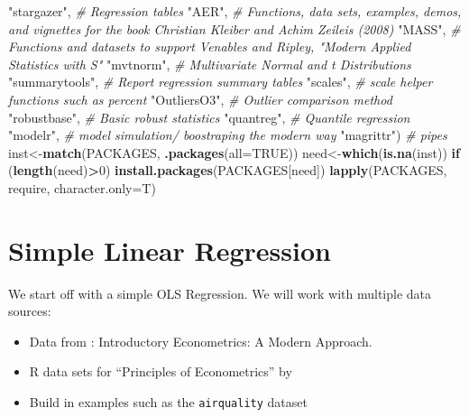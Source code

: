 \documentclass[]{book}
\newenvironment{Shaded}{\begin{snugshade}}{\end{snugshade}}
\newcommand{\CommentTok}[1]{\textcolor[rgb]{0.56,0.35,0.01}{\textit{#1}}}
\newcommand{\ControlFlowTok}[1]{\textcolor[rgb]{0.13,0.29,0.53}{\textbf{#1}}}
\newcommand{\DataTypeTok}[1]{\textcolor[rgb]{0.13,0.29,0.53}{#1}}
\newcommand{\DecValTok}[1]{\textcolor[rgb]{0.00,0.00,0.81}{#1}}
\newcommand{\KeywordTok}[1]{\textcolor[rgb]{0.13,0.29,0.53}{\textbf{#1}}}
\newcommand{\NormalTok}[1]{#1}
\newcommand{\OperatorTok}[1]{\textcolor[rgb]{0.81,0.36,0.00}{\textbf{#1}}}
\newcommand{\OtherTok}[1]{\textcolor[rgb]{0.56,0.35,0.01}{#1}}
\newcommand{\StringTok}[1]{\textcolor[rgb]{0.31,0.60,0.02}{#1}}
\providecommand{\tightlist}{%
  \setlength{\itemsep}{0pt}\setlength{\parskip}{0pt}}
\begin{document}
\begin{Shaded}
\begin{Highlighting}[]
            \StringTok{"stargazer"}\NormalTok{, }\CommentTok{# Regression tables}
            \StringTok{"AER"}\NormalTok{, }\CommentTok{#  Functions, data sets, examples, demos, and vignettes for the book Christian Kleiber and Achim Zeileis (2008)}
            \StringTok{"MASS"}\NormalTok{,  }\CommentTok{#  Functions and datasets to support Venables and Ripley,  "Modern Applied Statistics with S"}
            \StringTok{"mvtnorm"}\NormalTok{, }\CommentTok{# Multivariate Normal and t Distributions }
            \StringTok{"summarytools"}\NormalTok{, }\CommentTok{# Report regression summary tables}
            \StringTok{"scales"}\NormalTok{, }\CommentTok{# scale helper functions such as percent }
            \StringTok{"OutliersO3"}\NormalTok{, }\CommentTok{# Outlier comparison method}
            \StringTok{"robustbase"}\NormalTok{, }\CommentTok{# Basic robust statistics}
            \StringTok{"quantreg"}\NormalTok{, }\CommentTok{# Quantile regression}
            \StringTok{"modelr"}\NormalTok{, }\CommentTok{# model simulation/ boostraping the modern way}
            \StringTok{"magrittr"}\NormalTok{) }\CommentTok{#  pipes}
\NormalTok{inst<-}\KeywordTok{match}\NormalTok{(PACKAGES, }\KeywordTok{.packages}\NormalTok{(}\DataTypeTok{all=}\OtherTok{TRUE}\NormalTok{))}
\NormalTok{need<-}\KeywordTok{which}\NormalTok{(}\KeywordTok{is.na}\NormalTok{(inst))}
\ControlFlowTok{if}\NormalTok{ (}\KeywordTok{length}\NormalTok{(need)}\OperatorTok{>}\DecValTok{0}\NormalTok{) }\KeywordTok{install.packages}\NormalTok{(PACKAGES[need])}
\KeywordTok{lapply}\NormalTok{(PACKAGES, require, }\DataTypeTok{character.only=}\NormalTok{T)}
\end{Highlighting}
\end{Shaded}

\hypertarget{simple-linear-regression}{%
\section{Simple Linear Regression}\label{simple-linear-regression}}

We start off with a simple OLS Regression. We will work with multiple
data sources:

\begin{itemize}
\tightlist
\item
  Data from \citet{wooldridge2015introductory} : Introductory
  Econometrics: A Modern Approach.
\item
  R data sets for ``Principles of Econometrics'' by
  \citet{hill2008principles}
\item
  Build in examples such as the \texttt{airquality} dataset
\end{itemize}
\end{document}

